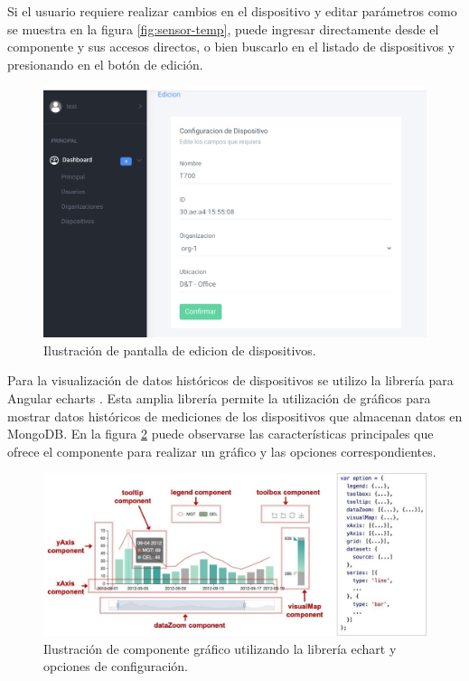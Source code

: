 Si el usuario requiere realizar cambios en el dispositivo y editar parámetros como se muestra en la figura \ref{fig:sensor-temp}, puede ingresar directamente desde el componente y sus accesos directos, o bien buscarlo en el listado de dispositivos y presionando en el botón de edición.

 \begin{figure}[htpb]
	\centering
	\includegraphics[scale=.30]{./Figures/edicion-dev.png}
	\caption[Pantalla de edición de dispositivos]{Ilustración de pantalla de edicion de dispositivos.}
	\label{fig:edicion-dev}
\end{figure}


Para la visualización de datos históricos de dispositivos se utilizo la librería para Angular echarts \citep{WEBSITE:43}. Esta amplia librería permite la utilización de gráficos para mostrar datos históricos de mediciones de los dispositivos que almacenan datos en MongoDB. En la figura \ref{fig:echart-grafica} puede observarse las características principales que ofrece el componente para realizar un gráfico y las opciones correspondientes.

\begin{figure}[htpb]
	\centering
	\includegraphics[scale=.30]{./Figures/echart-grafica.jpg}
	\caption[Componente gráfico de echarts]{Ilustración de componente gráfico utilizando la librería echart y opciones de configuración.}
	\label{fig:echart-grafica}
\end{figure}

